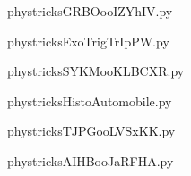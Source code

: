     \newcommand{\CaptionFigGRBOooIZYhIV}{<+Type your caption here+>}
    \begin{center}
        
    \end{center}
    phystricksGRBOooIZYhIV.py

    

    \clearpage
    


    \newcommand{\CaptionFigExoTrigTrIpPW}{<+Type your caption here+>}
    \begin{center}
        
    \end{center}
    phystricksExoTrigTrIpPW.py

    

    \clearpage
    


    \newcommand{\CaptionFigSYKMooKLBCXR}{<+Type your caption here+>}
    \begin{center}
        
    \end{center}
    phystricksSYKMooKLBCXR.py

    

    \clearpage
    


    \newcommand{\CaptionFigHistoAutomobile}{<+Type your caption here+>}
    \begin{center}
        
    \end{center}
    phystricksHistoAutomobile.py

    

    \clearpage
    


    \newcommand{\CaptionFigTJPGooLVSxKK}{<+Type your caption here+>}
    \begin{center}
        
    \end{center}
    phystricksTJPGooLVSxKK.py

    

    \clearpage
    


    \newcommand{\CaptionFigAIHBooJaRFHA}{<+Type your caption here+>}
    \begin{center}
        
    \end{center}
    phystricksAIHBooJaRFHA.py

